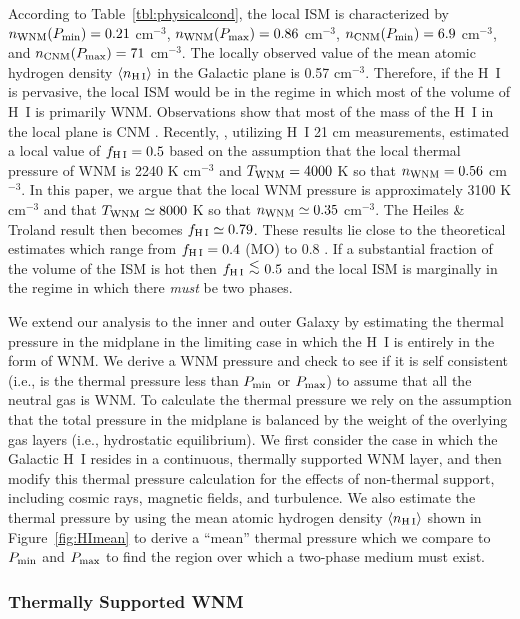\documentclass[12pt,preprint,flushrt]{aastex}
\newcommand{\eee}{$^{-3}$}
\newcommand{\pmax}{P_{\rm max}}
\newcommand{\pmin}{P_{\rm min}}
\newcommand{\al}{\mbox{ \raisebox{-.4ex}{$\stackrel{\textstyle <}{\sim}$} }}
\begin{document}
According to Table~\ref{tbl:physicalcond}, 
the local ISM is characterized by
$n_{\rm WNM}(P_{\rm min})=0.21$ cm\eee,
$n_{\rm WNM}(P_{\rm max})=0.86$ cm\eee,
$n_{\rm CNM}(P_{\rm min})=6.9$ cm\eee, and
$n_{\rm CNM}(P_{\rm max})=71$ cm\eee.  The locally observed value of
the mean atomic hydrogen density 
$\langle n_{\rm H\,I}\rangle $ in the Galactic plane is 0.57 cm\eee.
Therefore,
if the H~I is pervasive, the local ISM would be in the regime in
which most of the volume of H~I is primarily WNM.  Observations
show that most of the mass of the H~I in the local plane is CNM
\citep{dic90}.
Recently, \cite{hei02}, utilizing H~I 21 cm measurements,
estimated a local value of $f_{\rm H\, I} = 0.5$ based on the assumption
that the local thermal pressure of WNM is 2240 K cm$^{-3}$ and 
$T_{\rm WNM} = 4000$ K so that $n_{\rm WNM} = 0.56$ cm$^{-3}$. In this
paper, we argue that the local WNM pressure is approximately 3100 K cm$^{-3}$
and that $T_{\rm WNM} \simeq 8000$ K so that $n_{\rm WNM} \simeq 0.35$
cm$^{-3}$. The Heiles \& Troland result then becomes $f_{\rm H\, I} \simeq
0.79$. These results lie close to the theoretical estimates which range
from $f_{\rm H\, I} = 0.4$ (MO) to 0.8 \citep{slav93}.
If a substantial fraction
of the volume of the ISM is hot then $f_{\rm H\,I}\al
0.5$ and the local ISM is marginally
in the regime in which there {\em must} be two
phases. 

We extend our analysis to the inner and outer Galaxy
by  estimating  the thermal pressure in the midplane
in the limiting case in which the H~I is entirely in the form of WNM.
We derive a WNM pressure and check to see if it is self consistent
(i.e., is the thermal pressure less than $\pmin$ or $\pmax$) to 
assume that all the neutral gas is WNM.
To calculate the thermal pressure
we rely on the assumption that the total pressure in the midplane is balanced
by the weight of the overlying gas layers (i.e., hydrostatic equilibrium).
We first consider the
case in which the Galactic H~I resides in a continuous, thermally
supported  WNM layer, and then modify this thermal pressure calculation
for the effects of non-thermal support, including cosmic rays, magnetic
fields,  and turbulence.
We also estimate the thermal pressure
by using the mean atomic hydrogen density $\langle n_{\rm H\, I} \rangle$ 
shown in Figure~\ref{fig:HImean} to derive a ``mean'' thermal pressure which
we compare to $\pmin$ and $\pmax$ to find the region over which a
two-phase medium must exist.


\subsubsection{Thermally Supported WNM}\label{subsub:thermalsupwnm}
\end{document}
